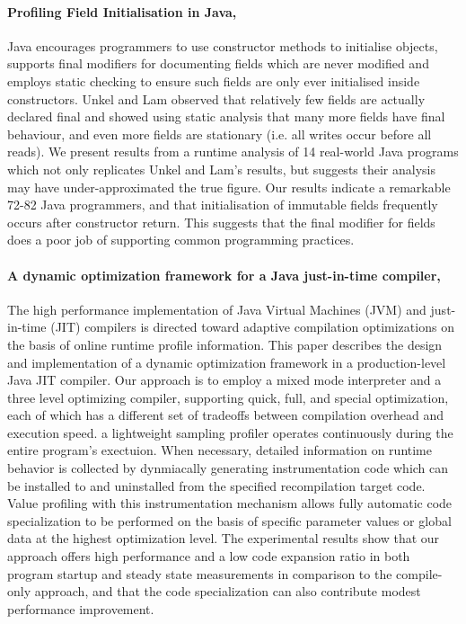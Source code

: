 \paragraph{Profiling Field Initialisation in Java, \cite{Nelson2013}}
Java encourages programmers to use constructor methods to
initialise objects, supports final modifiers for documenting fields which
are never modified and employs static checking to ensure such fields
are only ever initialised inside constructors. Unkel and Lam observed
that relatively few fields are actually declared final and showed using
static analysis that many more fields have final behaviour, and even more
fields are stationary (i.e. all writes occur before all reads). We present
results from a runtime analysis of 14 real-world Java programs which
not only replicates Unkel and Lam’s results, but suggests their analysis
may have under-approximated the true figure. Our results indicate a
remarkable 72-82%
Java programmers, and that initialisation of immutable fields frequently
occurs after constructor return. This suggests that the final modifier for
fields does a poor job of supporting common programming practices.
\paragraph{A dynamic optimization framework for a Java just-in-time compiler, \cite{Suganuma:2001:DOF:504311.504296}}
The high performance implementation of Java Virtual Machines (JVM) and just-in-time (JIT) compilers is directed toward adaptive compilation optimizations on the basis of online runtime profile information. This paper describes the design and implementation of a dynamic optimization framework in a production-level Java JIT compiler. Our approach is to employ a mixed mode interpreter and a three level optimizing compiler, supporting quick, full, and special optimization, each of which has a different set of tradeoffs between compilation overhead and execution speed. a lightweight sampling profiler operates continuously during the entire program's exectuion. When necessary, detailed information on runtime behavior is collected by dynmiacally generating instrumentation code which can be installed to and uninstalled from the specified recompilation target code. Value profiling with this instrumentation mechanism allows fully automatic code specialization to be performed on the basis of specific parameter values or global data at the highest optimization level. The experimental results show that our approach offers high performance and a low code expansion ratio in both program startup and steady state measurements in comparison to the compile-only approach, and that the code specialization can also contribute modest performance improvement.


